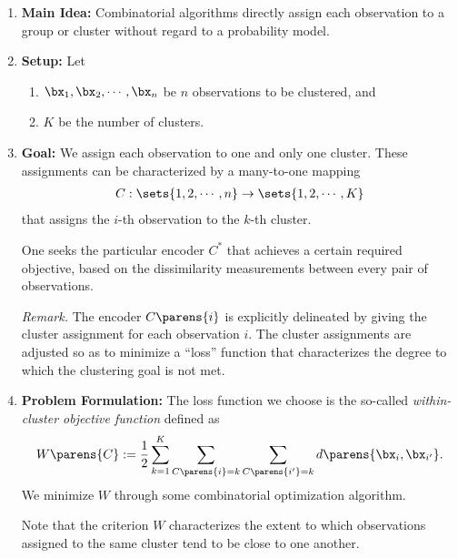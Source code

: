 \documentclass[12pt]{article}
\begin{document}
\begin{enumerate}[label=\textbf{\arabic*.}]

	\item \textbf{Main Idea:} Combinatorial algorithms directly assign each observation to a group or cluster without regard to a probability model. 
	
	\item \textbf{Setup:} Let 
	\begin{enumerate}
		\item $\bx_1, \bx_2, \cdots, \bx_n$ be $n$ observations to be clustered, and 
		\item $K$ be the number of clusters. 
	\end{enumerate}
	
	\item \textbf{Goal:} We assign each observation to one and only one cluster. These assignments can be characterized by a many-to-one mapping 
	\begin{align*}
		C: \sets{1, 2, \cdots, n} \to \sets{1, 2, \cdots, K}
	\end{align*}
	that assigns the $i$-th observation to the $k$-th cluster. 
	
	One seeks the particular encoder $C^*$ that achieves a certain required objective, based on the dissimilarity measurements between every pair of observations. 
	
	\textit{Remark.} The encoder $C \parens{i}$ is explicitly delineated by giving the cluster assignment for each observation $i$. The cluster assignments are adjusted so as to minimize a ``loss'' function that characterizes the degree to which the clustering goal is not met. 
	
	\item \textbf{Problem Formulation:} The loss function we choose is the so-called \emph{within-cluster objective function} defined as 
	\begin{align}
		W \parens{C} := \frac{1}{2} \sum_{k=1}^K \sum_{C \parens{i} = k} \sum_{C \parens{i'} = k} d \parens{\bx_{i}, \bx_{i'}}. 
	\end{align}
	We minimize $W$ through some combinatorial optimization algorithm. 
	
	Note that the criterion $W$ characterizes the extent to which observations assigned to the same cluster tend to be close to one another. 
	

\end{enumerate}
\end{document}
